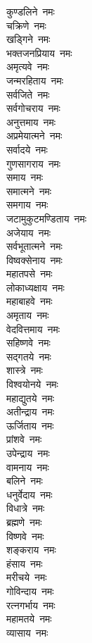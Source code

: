 \begin{multicols}{2}
\begin{flushleft}
कुण्डलिने~नमः\\
चक्रिणे~नमः\\
खड्गिने~नमः\\
भक्तजनप्रियाय~नमः\\
अमृत्यवे~नमः\\
जन्मरहिताय~नमः\\
सर्वजिते~नमः\\
सर्वगोचराय~नमः\\
अनुत्तमाय~नमः\hfill{}\\
अप्रमेयात्मने~नमः\\
सर्वादये~नमः\\
गुणसागराय~नमः\\
समाय~नमः\\
समात्मने~नमः\\
समगाय~नमः\\
जटामुकुटमण्डिताय~नमः\\
अजेयाय~नमः\\
सर्वभूतात्मने~नमः\\
विष्वक्सेनाय~नमः\hfill{}\\
महातपसे~नमः\\
लोकाध्यक्षाय~नमः\\
महाबाहवे~नमः\\
अमृताय~नमः\\
वेदवित्तमाय~नमः\\
सहिष्णवे~नमः\\
सद्गतये~नमः\\
शास्त्रे~नमः\\
विश्वयोनये~नमः\\
महाद्युतये~नमः\hfill{}\\
अतीन्द्राय~नमः\\
ऊर्जिताय~नमः\\
प्रांशवे~नमः\\
उपेन्द्राय~नमः\\
वामनाय~नमः\\
बलिने~नमः\\
धनुर्वेदाय~नमः\\
विधात्रे~नमः\\
ब्रह्मणे~नमः\\
विष्णवे~नमः\hfill{}\\
शङ्कराय~नमः\\
हंसाय~नमः\\
मरीचये~नमः\\
गोविन्दाय~नमः\\
रत्नगर्भाय~नमः\\
महामतये~नमः\\
व्यासाय~नमः\\

\end{flushleft}
\end{multicols}
